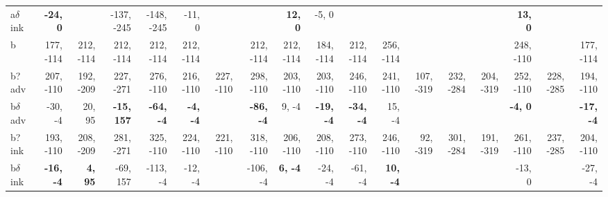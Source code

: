 \begin{table}[p]
{\begin{tabular}{lrrrrrrrrrrrrrrrrr}
a$\delta$ ink & \textbf{-24, 0} &  & -137, -245 & -148, -245 & -11, 0 &  &  & \textbf{12, 0} & -5, 0 &  &  &  &  &  & \textbf{13, 0} &  &  \\
b & 177, -114 & 212, -114 & 212, -114 & 212, -114 & 212, -114 &  & 212, -114 & 212, -114 & 184, -114 & 212, -114 & 256, -114 &  &  &  & 248, -110 &  & 177, -114 \\
b? adv & 207, -110 & 192, -209 & 227, -271 & 276, -110 & 216, -110 & 227, -110 & 298, -110 & 203, -110 & 203, -110 & 246, -110 & 241, -110 & 107, -319 & 232, -284 & 204, -319 & 252, -110 & 228, -285 & 194, -110 \\
b$\delta$ adv & -30, -4 & 20, 95 & \textbf{-15, 157} & \textbf{-64, -4} & \textbf{-4, -4} &  & \textbf{-86, -4} & 9, -4 & \textbf{-19, -4} & \textbf{-34, -4} & 15, -4 &  &  &  & \textbf{-4, 0} &  & \textbf{-17, -4} \\
b? ink & 193, -110 & 208, -209 & 281, -271 & 325, -110 & 224, -110 & 221, -110 & 318, -110 & 206, -110 & 208, -110 & 273, -110 & 246, -110 & 92, -319 & 301, -284 & 191, -319 & 261, -110 & 237, -285 & 204, -110 \\
b$\delta$ ink & \textbf{-16, -4} & \textbf{4, 95} & -69, 157 & -113, -4 & -12, -4 &  & -106, -4 & \textbf{6, -4} & -24, -4 & -61, -4 & \textbf{10, -4} &  &  &  & -13, 0 &  & -27, -4 \\

\end{tabular}
}
\end{table}
\clearpage


